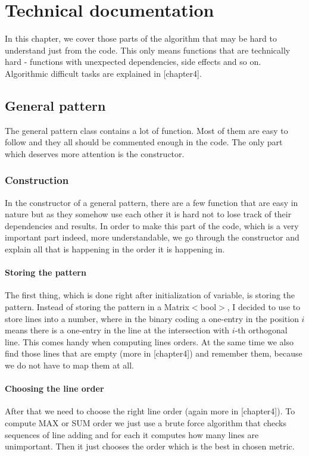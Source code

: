 \chapter{Technical documentation}
\label{chap:tdoc}
In this chapter, we cover those parts of the algorithm that may be hard to understand just from the code. This only means functions that are technically hard - functions with unexpected dependencies, side effects and so on. Algorithmic difficult tasks are explained in [chapter4].

\section{General pattern}
The general pattern class contains a lot of function. Most of them are easy to follow and they all should be commented enough in the code. The only part which deserves more attention is the constructor.

\subsection{Construction}
In the constructor of a general pattern, there are a few function that are easy in nature but as they somehow use each other it is hard not to lose track of their dependencies and results. In order to make this part of the code, which is a very important part indeed, more understandable, we go through the constructor and explain all that is happening in the order it is happening in.

\subsubsection{Storing the pattern}
The first thing, which is done right after initialization of variable, is storing the pattern. Instead of storing the pattern in a Matrix$<$bool$>$, I decided to use to store lines into a number, where in the binary coding a one-entry in the position $i$ means there is a one-entry in the line at the intersection with $i$-th orthogonal line. This comes handy when computing lines orders. At the same time we also find those lines that are empty (more in [chapter4]) and remember them, because we do not have to map them at all.

\subsubsection{Choosing the line order}
After that we need to choose the right line order (again more in [chapter4]). To compute MAX or SUM order we just use a brute force algorithm that checks sequences of line adding and for each it computes how many lines are unimportant. Then it just chooses the order which is the best in chosen metric.

